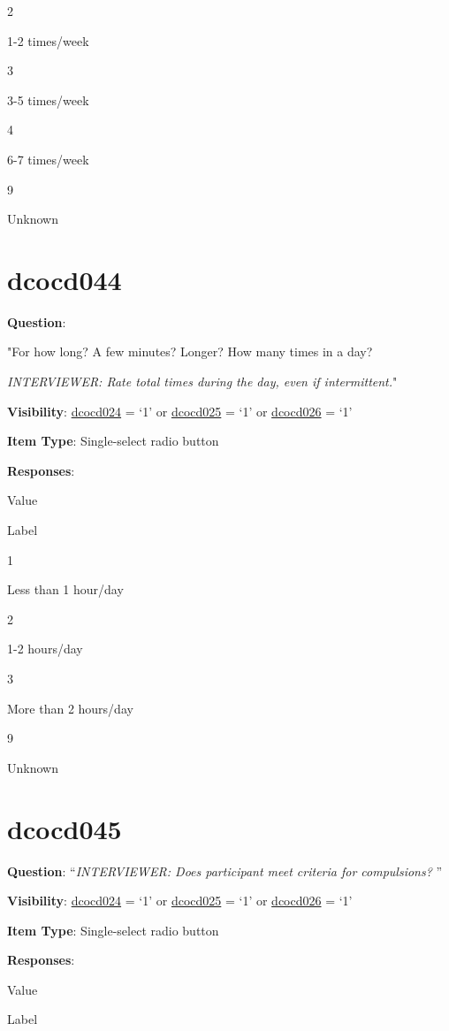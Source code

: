\documentclass[]{book}
\begin{document}
2

1-2 times/week

3

3-5 times/week

4

6-7 times/week

9

Unknown

\hypertarget{dcocd044}{%
\section{dcocd044}\label{dcocd044}}

\textbf{Question}:

"For how long? A few minutes? Longer? How many times in a day?

\emph{INTERVIEWER: Rate total times during the day, even if intermittent.}"

\textbf{Visibility}: \protect\hyperlink{dcocd024}{dcocd024} = `1' or \protect\hyperlink{dcocd025}{dcocd025} = `1' or \protect\hyperlink{dcocd026}{dcocd026} = `1'

\textbf{Item Type}: Single-select radio button

\textbf{Responses}:

Value

Label

1

Less than 1 hour/day

2

1-2 hours/day

3

More than 2 hours/day

9

Unknown

\hypertarget{dcocd045}{%
\section{dcocd045}\label{dcocd045}}

\textbf{Question}: ``\emph{INTERVIEWER: Does participant meet criteria for compulsions? }''

\textbf{Visibility}: \protect\hyperlink{dcocd024}{dcocd024} = `1' or \protect\hyperlink{dcocd025}{dcocd025} = `1' or \protect\hyperlink{dcocd026}{dcocd026} = `1'

\textbf{Item Type}: Single-select radio button

\textbf{Responses}:

Value

Label
\end{document}
